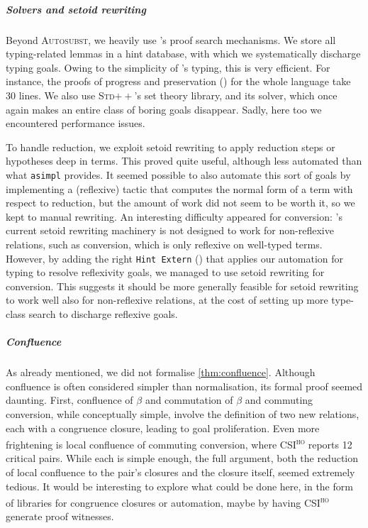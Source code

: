 \documentclass[a4paper,UKenglish,cleveref, autoref, thm-restate]{lipics-v2021}
\begin{document}
\subparagraph*{Solvers and setoid rewriting}

Beyond \textsc{Autosubst}, we heavily use \Rocq's proof search mechanisms.
We store all typing-related lemmas in a hint database, with which we systematically discharge typing goals. Owing to the simplicity of \stlc's typing,
this is very efficient. For instance, the proofs of progress and preservation
() for the whole language take 30 lines.
We also use \textsc{Std\(++\)}'s set theory library,
and its solver, which once again makes an entire class
of boring goals disappear. Sadly, here too we encountered performance issues.

To handle reduction, we exploit setoid rewriting to apply reduction steps or
hypotheses deep in terms. This proved quite useful, although less automated
than what \texttt{asimpl} provides. It seemed possible to also automate this
sort of goals by implementing a (reflexive) tactic that computes the normal
form of a term with respect to reduction, but the amount of work did not seem
to be worth it, so we kept to manual rewriting. An interesting difficulty appeared
for conversion: \Rocq's current setoid rewriting
machinery is not designed to work for non-reflexive relations, such as conversion,
which is only reflexive on well-typed terms. However, by adding the right
\texttt{Hint Extern} ()
that applies our automation for typing to resolve reflexivity
goals, we managed to use setoid rewriting for conversion. This suggests it should
be more generally feasible for setoid rewriting to work well also for non-reflexive
relations, at the cost of setting up more type-class search to discharge
reflexive goals.

\subparagraph*{Confluence}

As already mentioned, we did not formalise \cref{thm:confluence}.
Although confluence is often considered simpler than normalisation,
its formal proof seemed daunting. First,
confluence of \(\beta\) and commutation of \(\beta\) and commuting
conversion, while conceptually simple, involve the definition of two new relations,
each with a congruence closure, leading to goal proliferation.
Even more frightening is local confluence of commuting conversion, where
\textsc{CSI\textsuperscript{ho}} reports 12 critical pairs. While each
is simple enough, the full argument, both the reduction of
local confluence to the pair's closures and the closure itself, seemed
extremely tedious. It would be interesting to explore what could be done here,
in the form of libraries for congruence closures or automation, maybe by
having \textsc{CSI\textsuperscript{ho}} generate proof witnesses.
\end{document}
